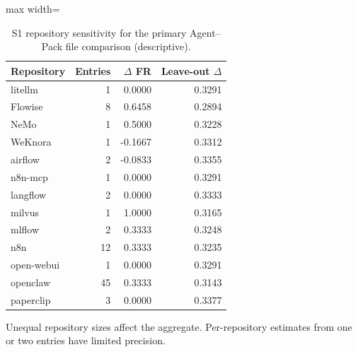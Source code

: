 \begin{table}[t]
\centering
\caption{S1 repository sensitivity for the primary Agent--Pack file comparison (descriptive).}\label{tab:repos}
\small
\begin{adjustbox}{max width=\columnwidth}\begin{tabular}{lrrr}
\toprule
Repository & Entries & $\Delta$ FR & Leave-out $\Delta$ \\
\midrule
litellm & 1 & 0.0000 & 0.3291 \\
Flowise & 8 & 0.6458 & 0.2894 \\
NeMo & 1 & 0.5000 & 0.3228 \\
WeKnora & 1 & -0.1667 & 0.3312 \\
airflow & 2 & -0.0833 & 0.3355 \\
n8n-mcp & 1 & 0.0000 & 0.3291 \\
langflow & 2 & 0.0000 & 0.3333 \\
milvus & 1 & 1.0000 & 0.3165 \\
mlflow & 2 & 0.3333 & 0.3248 \\
n8n & 12 & 0.3333 & 0.3235 \\
open-webui & 1 & 0.0000 & 0.3291 \\
openclaw & 45 & 0.3333 & 0.3143 \\
paperclip & 3 & 0.0000 & 0.3377 \\
\bottomrule
\end{tabular}\end{adjustbox}
\par\vspace{3pt}\begin{minipage}{\columnwidth}\footnotesize Unequal repository sizes affect the aggregate. Per-repository estimates from one or two entries have limited precision.\end{minipage}
\end{table}

